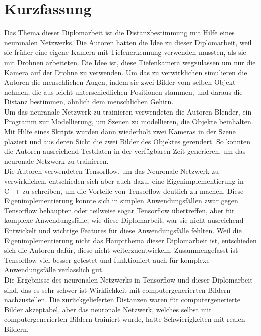 \chapter{Kurzfassung}

\vspace{10mm}

Das Thema dieser Diplomarbeit ist die Distanzbestimmung mit Hilfe eines neuronalen Netzwerks. Die Autoren hatten die Idee zu dieser Diplomarbeit, weil sie früher eine eigene Kamera mit Tiefenerkennung verwenden mussten, als sie mit Drohnen arbeiteten. Die Idee ist, diese Tiefenkamera wegzulassen um nur die Kamera auf der Drohne zu verwenden. Um das zu verwirklichen simulieren die Autoren die menschlichen Augen, indem sie zwei Bilder vom selben Objekt nehmen, die aus leicht unterschiedlichen Positionen stammen, und daraus die Distanz bestimmen, ähnlich dem menschlichen Gehirn.\\
Um das neuranale Netzwerk zu trainieren verwendeten die Autoren Blender, ein Programm zur Modellierung, um Szenen zu modellieren, die Objekte beinhalten. Mit Hilfe eines Skripts wurden dann wiederholt zwei Kameras in der Szene plaziert und aus deren Sicht die zwei Bilder des Objektes gerendert. So konnten die Autoren ausreichend Testdaten in der verfügbaren Zeit generieren, um das neuronale Netzwerk zu trainieren.\\
Die Autoren verwendeten Tensorflow, um das Neuronale Netzwerk zu verwirklichen, entschieden sich aber auch dazu, eine Eigenimplementierung in C++ zu schreiben, um die Vorteile von Tensorflow deutlich zu machen. Diese Eigenimplementierung konnte sich in simplen Anwendungsfällen zwar gegen Tensorflow behaupten oder teilweise sogar Tensorflow übertreffen, aber für komplexe Anwendungsfälle, wie diese Diplomarbeit, war sie nicht ausreichend Entwickelt und wichtige Features für diese Anwendungsfälle fehlten. Weil die Eigenimplementierung nicht das Hauptthema dieser Diplomarbeit ist, entschieden sich die Autoren dafür, diese nicht weiterzuentwickeln. Zusammengefasst ist Tensorflow viel besser getestet und funktioniert auch für komplexe Anwendungsfälle verlässlich gut.\\
Die Ergebnisse des neuronalen Netzwerks in Tensorflow und dieser Diplomarbeit sind, das es sehr schwer ist Wirklichkeit mit computergenerierten Bildern nachzustellen. Die zurückgelieferten Distanzen waren für computergenerierte Bilder akzeptabel, aber das neuronale Netzwerk, welches selbst mit computergenerierten Bildern trainiert wurde, hatte Schwierigkeiten mit realen Bildern.


